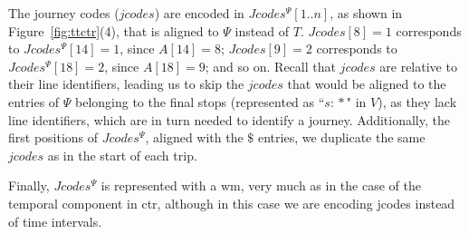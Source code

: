     The journey codes ($jcodes$) are encoded in $Jcodes^{\Psi}[1..n]$, as shown in Figure~\ref{fig:ttctr}(4), that is aligned to $\Psi$ instead of $T$. $Jcodes[8]= 1$ corresponds to $Jcodes^{\Psi}[14]=1$, since $A[14]=8$; $Jcodes[9]= 2$ corresponds to $Jcodes^{\Psi}[18]=2$, since $A[18]=9$; and so on. Recall that $jcodes$ are relative to their line identifiers, leading us to skip the $jcodes$ that would be aligned to the entries of $\Psi$ belonging to the final stops (represented as ``$s\!:\!*$" in $V$), as they lack line identifiers, which are in turn needed to identify a journey. Additionally, the first positions of $Jcodes^{\Psi}$, aligned with the $\$$ entries, we duplicate the same $jcodes$ as in the start of each trip.
	
    Finally, $Jcodes^{\Psi}$ is represented with a \gls{wm}, very much as in the case of the temporal component in \gls{ctr}, although in this case we are encoding jcodes instead of time intervals.
    
